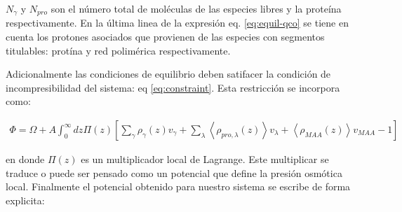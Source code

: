 \noindent $N_\gamma$ y $ N_{pro}$ son el n\'umero total de mol\'eculas de las especies libres y la prote\'ina respectivamente. En la \'ultima linea de la expresi\'on eq. \ref{eq:equil-qco} se tiene en cuenta los protones asociados que  provienen de las especies con segmentos titulables: prot\'ina y red polim\'erica respectivamente.


Adicionalmente las condiciones de equilibrio deben satifacer la condici\'on de incompresibilidad del sistema: eq \ref{eq:constraint}.  Esta restricci\'on se incorpora como:

\begin{align}
	\Phi = \Omega +A \int_0^\infty dz\Pi(z){\left[\sum_{\gamma}\rho_\gamma(z) v_\gamma + \sum_\lambda{\left<\rho_{pro,\lambda}(z)\right>v_\lambda} + \left<\rho_{MAA}(z)\right>v_{MAA} -1 \right]}
\end{align}


\noindent en donde $\Pi(z)$ es un multiplicador local de Lagrange.  Este multiplicar se traduce o puede ser pensado como un potencial que define la presi\'on osm\'otica local. Finalmente el potencial obtenido para nuestro sistema se escribe de forma explicita:
 
